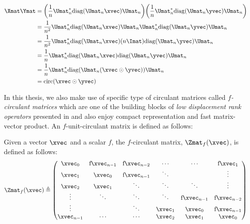 \begin{itemize}[leftmargin=13pt]
    \begin{align}
      \Xmat \Ymat &= \left( \frac{1}{n} \Umat_n^* \diag(\Umat_n \xvec) \Umat_n \right) \left( \frac{1}{n} \Umat_n^* \diag(\Umat_n \yvec) \Umat_n \right) \\
      &= \frac{1}{n^2}  \Umat_n^* \diag(\Umat_n \xvec) \Umat_n \Umat_n^* \diag(\Umat_n \yvec) \Umat_n  \\
      &= \frac{1}{n^2}  \Umat_n^* \diag(\Umat_n \xvec) (n \Imat) \diag(\Umat_n \yvec) \Umat_n  \\
      &= \frac{1}{n}  \Umat_n^* \diag(\Umat_n \xvec) \diag(\Umat_n \yvec) \Umat_n  \\
      &= \frac{1}{n}  \Umat_n^* \diag(\Umat_n (\xvec \odot \yvec)) \Umat_n  \\
      &= \circulant(\xvec \odot \yvec)
    \end{align}
\end{itemize}

\endgroup



In this thesis, we also make use of specific type of circulant matrices called \emph{$f$-circulant matrices} which are one of the building blocks of \emph{low displacement rank operators} presented in  and also enjoy compact representation and fast matrix-vector product.
An $f$-unit-circulant matrix is defined as follows:

\begin{definition} \label{definition:ch2-f_circulant_matrix}
  Given a vector $\xvec$ and a scalar $f$, the $f$-circulant matrix, $\Zmat_f(\xvec)$, is defined as follows:
  \begin{equation}
    \Zmat_f(\xvec) \triangleq
    \leftmatrix
      \xvec_0 & $f$ \xvec_{n-1} & $f$ \xvec_{n-2} & \cdots & \cdots & $f$ \xvec_{1} \\
      \xvec_{1} & \xvec_0 & $f$ \xvec_{n-1} & \ddots & & \vdots \\
      \xvec_{2} & \xvec_{1} & \ddots & \ddots & \ddots & \vdots \\ 
      \vdots & \ddots & \ddots & \ddots & $f$ \xvec_{n-1} & $f$ \xvec_{n-2} \\
      \vdots & & \ddots & \xvec_{1} & \xvec_{0} & $f$ \xvec_{n-1} \\
      \xvec_{n-1} & \cdots & \cdots & \xvec_{2} & \xvec_{1} & \xvec_0
    \rightmatrix
  \end{equation}
\end{definition}


